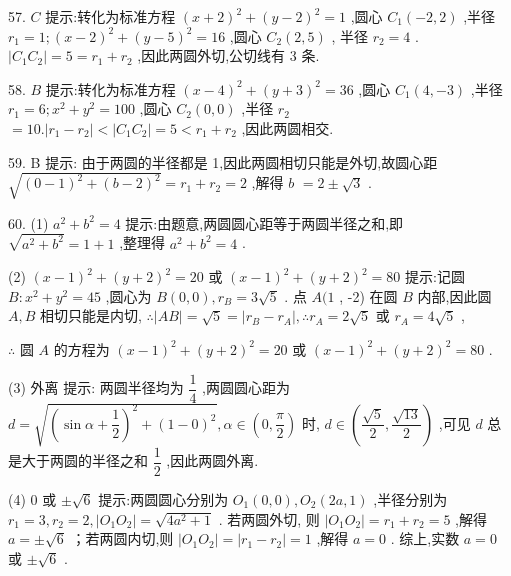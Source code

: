 57. $C$ 提示:转化为标准方程 ${\left( x + 2\right) }^{2} + {\left( y - 2\right) }^{2} = 1$ ,圆心 ${C}_{1}\left( {-2,2}\right)$ ,半径 ${r}_{1} = 1;{\left( x - 2\right) }^{2} + {\left( y - 5\right) }^{2} = {16}$ ,圆心 ${C}_{2}\left( {2,5}\right)$ , 半径 ${r}_{2} = 4$ . $\left| {{C}_{1}{C}_{2}}\right|  = 5 = {r}_{1} + {r}_{2}$ ,因此两圆外切,公切线有 3 条.

58. $B$ 提示:转化为标准方程 ${\left( x - 4\right) }^{2} + {\left( y + 3\right) }^{2} = {36}$ ,圆心 ${C}_{1}\left( {4, - 3}\right)$ ,半径 ${r}_{1} = 6;{x}^{2} + {y}^{2} = {100}$ ,圆心 ${C}_{2}\left( {0,0}\right)$ ,半径 ${r}_{2}$  $= {10}.\left| {{r}_{1} - {r}_{2}}\right|  < \left| {{C}_{1}{C}_{2}}\right|  = 5 < {r}_{1} + {r}_{2}$ ,因此两圆相交.

59. B 提示: 由于两圆的半径都是 1,因此两圆相切只能是外切,故圆心距 $\sqrt{{\left( 0 - 1\right) }^{2} + {\left( b - 2\right) }^{2}} = {r}_{1} + {r}_{2} = 2$ ,解得 $b$  $= 2 \pm  \sqrt{3}$ .

60. (1) ${a}^{2} + {b}^{2} = 4$ 提示:由题意,两圆圆心距等于两圆半径之和,即 $\sqrt{{a}^{2} + {b}^{2}} = 1 + 1$ ,整理得 ${a}^{2} + {b}^{2} = 4$ .

(2) ${\left( x - 1\right) }^{2} + {\left( y + 2\right) }^{2} = {20}$ 或 ${\left( x - 1\right) }^{2} + {\left( y + 2\right) }^{2} = {80}$ 提示:记圆 $B : {x}^{2} + {y}^{2} = {45}$ ,圆心为 $B\left( {0,0}\right) ,{r}_{B} = 3\sqrt{5}$ . 点 $A(1$ , -2) 在圆 $B$ 内部,因此圆 $A,B$ 相切只能是内切, $\therefore \left| {AB}\right|  = \sqrt{5} = \left| {{r}_{B} - {r}_{A}}\right| ,\therefore {r}_{A} = 2\sqrt{5}$ 或 ${r}_{A} = 4\sqrt{5}$ ,

$\therefore$ 圆 $A$ 的方程为 ${\left( x - 1\right) }^{2} + {\left( y + 2\right) }^{2} = {20}$ 或 ${\left( x - 1\right) }^{2} + {\left( y + 2\right) }^{2} = {80}$ .

(3) 外离 提示: 两圆半径均为 $\dfrac{1}{4}$ ,两圆圆心距为 $d = \sqrt{{\left( \sin \alpha  + \dfrac{1}{2}\right) }^{2} + {\left( 1 - 0\right) }^{2}},\alpha  \in  \left( {0,\dfrac{\pi }{2}}\right)$ 时, $d \in  \left( {\dfrac{\sqrt{5}}{2},\dfrac{\sqrt{13}}{2}}\right)$ ,可见 $d$ 总是大于两圆的半径之和 $\dfrac{1}{2}$ ,因此两圆外离.

(4) 0 或 $\pm  \sqrt{6}$ 提示:两圆圆心分别为 ${O}_{1}\left( {0,0}\right) ,{O}_{2}\left( {{2a},1}\right)$ ,半径分别为 ${r}_{1} = 3,{r}_{2} = 2,\left| {{O}_{1}{O}_{2}}\right|  = \sqrt{4{a}^{2} + 1}$ . 若两圆外切, 则 $\left| {{O}_{1}{O}_{2}}\right|  = {r}_{1} + {r}_{2} = 5$ ,解得 $a =  \pm  \sqrt{6}$ ；若两圆内切,则 $\left| {{O}_{1}{O}_{2}}\right|  = \left| {{r}_{1} - {r}_{2}}\right|  = 1$ ,解得 $a = 0$ . 综上,实数 $a = 0$ 或 $\pm  \sqrt{6}$ .

